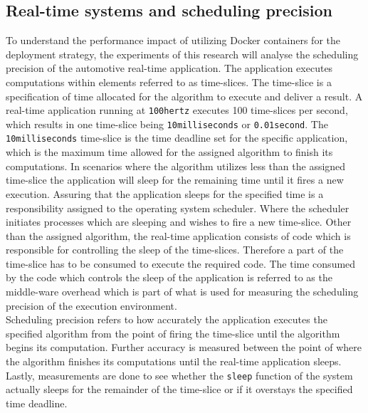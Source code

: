 \subsection{Real-time systems and scheduling precision}

To understand the performance impact of utilizing Docker containers for the deployment strategy, the experiments of this research will analyse the scheduling precision of the automotive real-time application. The application executes computations within elements referred to as time-slices. The time-slice is a specification of time allocated for the algorithm to execute and deliver a result. A real-time application running at \texttt{100hertz} executes 100 time-slices per second, which results in one time-slice being \texttt{10milliseconds} or \texttt{0.01second}. The \texttt{10milliseconds} time-slice is the time deadline set for the specific application, which is the maximum time allowed for the assigned algorithm to finish its computations. In scenarios where the algorithm utilizes less than the assigned time-slice the application will sleep for the remaining time until it fires a new execution. Assuring that the application sleeps for the specified time is a responsibility assigned to the operating system scheduler. Where the scheduler initiates processes which are sleeping and wishes to fire a new time-slice. Other than the assigned algorithm, the real-time application consists of code which is responsible for controlling the sleep of the time-slices. Therefore a part of the time-slice has to be consumed to execute the required code. The time consumed by the code which controls the sleep of the application is referred to as the middle-ware overhead which is part of what is used for measuring the scheduling precision of the execution environment.\\

Scheduling precision refers to how accurately the application executes the specified algorithm from the point of firing the time-slice until the algorithm begins its computation. Further accuracy is measured between the point of where the algorithm finishes its computations until the real-time application sleeps. Lastly, measurements are done to see whether the \texttt{sleep} function of the system actually sleeps for the remainder of the time-slice or if it overstays the specified time deadline.\\

